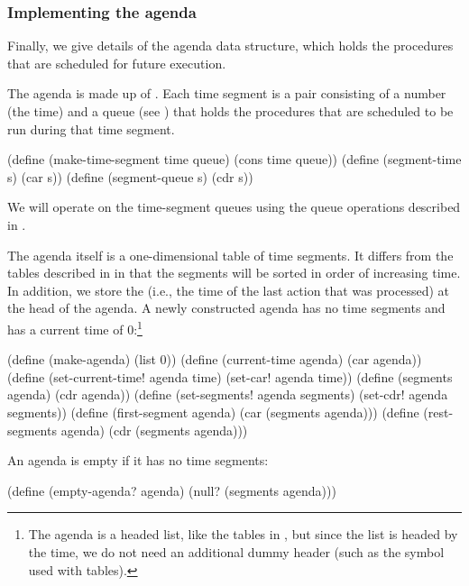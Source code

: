 \subsubsection*{Implementing the agenda}

Finally, we give details of the agenda data structure, which holds the
procedures that are scheduled for future execution.

The agenda is made up of .  Each time segment is a pair
consisting of a number (the time) and a queue (see ) that
holds the procedures that are scheduled to be run during that time segment.

\begin{codeBlock}
(define (make-time-segment time queue)
  (cons time queue))
(define (segment-time s) (car s))
(define (segment-queue s) (cdr s))
\end{codeBlock}

\noindent
We will operate on the time-segment queues using the queue operations described
in .

The agenda itself is a one-dimensional table of time segments.  It differs from
the tables described in  in that the segments will be sorted
in order of increasing time.  In addition, we store the 
(i.e., the time of the last action that was processed) at the head of the
agenda.  A newly constructed agenda has no time segments and has a current time
of 0:\footnote{The agenda is a headed list, like the tables in
, but since the list is headed by the time, we do not need an
additional dummy header (such as the  symbol used with tables).}

\begin{codeBlock}
(define (make-agenda) (list 0))
(define (current-time agenda) (car agenda))
(define (set-current-time! agenda time)
  (set-car! agenda time))
(define (segments agenda) (cdr agenda))
(define (set-segments! agenda segments)
  (set-cdr! agenda segments))
(define (first-segment agenda) (car (segments agenda)))
(define (rest-segments agenda) (cdr (segments agenda)))
\end{codeBlock}

\noindent
An agenda is empty if it has no time segments:

\begin{codeBlock}
(define (empty-agenda? agenda)
  (null? (segments agenda)))
\end{codeBlock}

